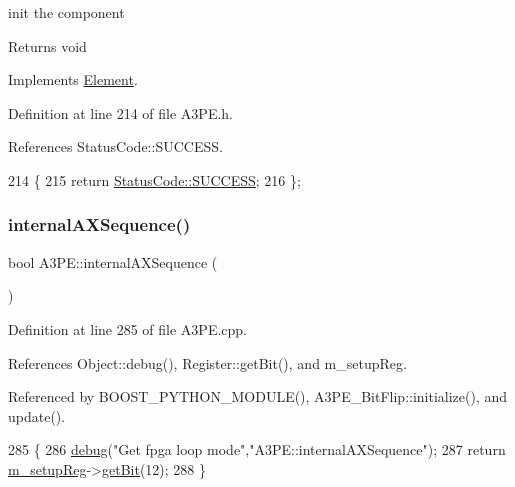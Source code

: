 init the component

\begin{DoxyReturn}{Returns}
void 
\end{DoxyReturn}


Implements \hyperlink{classElement_af42754b5cabc198869222725218d695c}{Element}.



Definition at line 214 of file A3\+P\+E.\+h.



References Status\+Code\+::\+S\+U\+C\+C\+E\+SS.


\begin{DoxyCode}
214                     \{
215     \textcolor{keywordflow}{return} \hyperlink{classStatusCode_a6f565cbeadc76d14c72f047e5e85eb4badd0da38d3ba0d922efd1f4619bc37ad8}{StatusCode::SUCCESS};
216   \};
\end{DoxyCode}
\mbox{\label{classA3PE_a4b9cf42bdd0a14e48807faa0956c59bd}} 
\subsubsection{\texorpdfstring{internal\+A\+X\+Sequence()}{internalAXSequence()}}
{\footnotesize\ttfamily bool A3\+P\+E\+::internal\+A\+X\+Sequence (\begin{DoxyParamCaption}{ }\end{DoxyParamCaption})}



Definition at line 285 of file A3\+P\+E.\+cpp.



References Object\+::debug(), Register\+::get\+Bit(), and m\+\_\+setup\+Reg.



Referenced by B\+O\+O\+S\+T\+\_\+\+P\+Y\+T\+H\+O\+N\+\_\+\+M\+O\+D\+U\+L\+E(), A3\+P\+E\+\_\+\+Bit\+Flip\+::initialize(), and update().


\begin{DoxyCode}
285                              \{
286   \hyperlink{classObject_aac010553f022165573714b7014a15f0d}{debug}(\textcolor{stringliteral}{"Get fpga loop mode"},\textcolor{stringliteral}{"A3PE::internalAXSequence"});
287   \textcolor{keywordflow}{return} \hyperlink{classA3PE_a142fa10b7e705c4701ae21678ec2ec8a}{m\_setupReg}->\hyperlink{classRegister_a5d27c9ff548817eee097ba4fdc8e8f69}{getBit}(12);
288 \}
\end{DoxyCode}
\mbox{\label{classA3PE_ab5970721a8172ae57b3da68040f58199}} 
